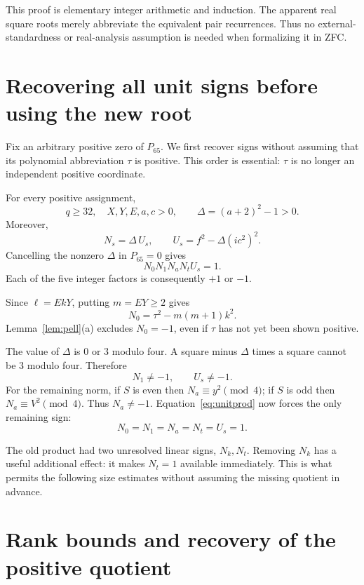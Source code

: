 \documentclass[11pt,letterpaper]{article}
\theoremstyle{definition}
\begin{document}
This proof is elementary integer arithmetic and induction. The apparent
real square roots merely abbreviate the equivalent pair recurrences.
Thus no external-standardness or real-analysis assumption is needed
when formalizing it in ZFC.

\section{Recovering all unit signs before using the new root}

Fix an arbitrary positive zero of \(P_{65}\). We first recover signs
without assuming that its polynomial abbreviation \(\tau\) is positive.
This order is essential: \(\tau\) is no longer an independent positive
coordinate.

For every positive assignment,
\[
 q\ge32,\quad X,Y,E,a,c>0,\qquad
 \Delta=(a+2)^2-1>0.
\]
Moreover,
\[
 N_s=\Delta\,U_s,\qquad
 U_s=f^2-\Delta(i c^2)^2.
\]
Cancelling the nonzero \(\Delta\) in \(P_{65}=0\) gives
\begin{equation}\label{eq:unitprod}
 N_0N_1N_aN_tU_s=1.
\end{equation}
Each of the five integer factors is consequently \(+1\) or \(-1\).

Since \(\ell=EkY\), putting \(m=EY\ge2\) gives
\[
 N_0=\tau^2-m(m+1)k^2.
\]
Lemma~\ref{lem:pell}(a) excludes \(N_0=-1\), even if \(\tau\)
has not yet been shown positive.

The value of \(\Delta\) is \(0\) or \(3\) modulo four. A square minus
\(\Delta\) times a square cannot be \(3\) modulo four. Therefore
\[
 N_1\ne-1,\qquad U_s\ne-1.
\]
For the remaining norm, if \(S\) is even then \(N_a\equiv y^2\pmod4\);
if \(S\) is odd then \(N_a\equiv V^2\pmod4\). Thus \(N_a\ne-1\).
Equation~\eqref{eq:unitprod} now forces the only remaining sign:
\begin{equation}\label{eq:allunits}
 \boxed{N_0=N_1=N_a=N_t=U_s=1.}
\end{equation}

The old product had two unresolved linear signs, \(N_k,N_t\).
Removing \(N_k\) has a useful additional effect: it makes \(N_t=1\)
available immediately. This is what permits the following size estimates
without assuming the missing quotient in advance.

\section{Rank bounds and recovery of the positive quotient}
\end{document}
